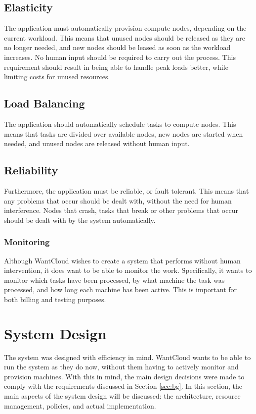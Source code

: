 \documentclass{acm_proc_article-sp}
\begin{document}
\subsection{Elasticity}
The application must automatically provision compute nodes, depending on the current workload.
This means that unused nodes should be released as they are no longer needed, and new nodes should be leased as soon as the workload increases.
No human input should be required to carry out the process.
This requirement should result in being able to handle peak loads better, while limiting costs for unused resources.

\subsection{Load Balancing}
The application should automatically schedule tasks to compute nodes.
This means that tasks are divided over available nodes, new nodes are started when needed, and unused nodes are released without human input.

\subsection{Reliability}
Furthermore, the application must be reliable, or fault tolerant.
This means that any problems that occur should be dealt with, without the need for human interference.
Nodes that crash, tasks that break or other problems that occur should be dealt with by the system automatically.

\subsubsection{Monitoring}
Although WantCloud wishes to create a system that performs without human intervention, it does want to be able to monitor the work.
Specifically, it wants to monitor which tasks have been processed, by what machine the task was processed, and how long each machine has been active.
This is important for both billing and testing purposes.

\section{System Design}
\label{sec:system}
The system was designed with efficiency in mind.
WantCloud wants to be able to run the system as they do now, without them having to actively monitor and provision machines.
With this in mind, the main design decisions were made to comply with the requirements discussed in Section \ref{sec:bg}.
In this section, the main aspects of the system design will be discussed: the architecture, resource management, policies, and actual implementation.
\end{document}
